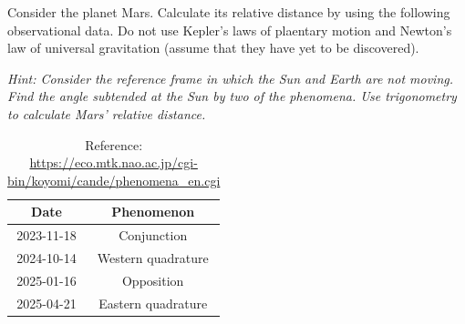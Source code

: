 \documentclass[main.tex]{subfiles}
\begin{document}
\begin{q}{1}
Consider the planet Mars. Calculate its relative distance by using the following observational data. Do not use Kepler's laws of plaentary motion and Newton's law of universal gravitation (assume that they have yet to be discovered).

\noindent\textit{Hint: Consider the reference frame in which the Sun and Earth are not moving. Find the angle subtended at the Sun by two of the phenomena. Use trigonometry to calculate Mars' relative distance.}

\begin{table}[h!]
    \centering
    \begin{tabular}{|c|c|}
    \hline
    \textbf{Date} & \textbf{Phenomenon} \\
    \hline
    2023-11-18 & Conjunction \\
    2024-10-14 & Western quadrature \\
    2025-01-16 & Opposition \\
    2025-04-21 & Eastern quadrature \\
    \hline
    \end{tabular}
    \caption*{Reference: \href{https://eco.mtk.nao.ac.jp/cgi-bin/koyomi/cande/phenomena_en.cgi}{https://eco.mtk.nao.ac.jp/cgi-bin/koyomi/cande/phenomena\_en.cgi}}
    \end{table}
\end{q}
\end{document}
